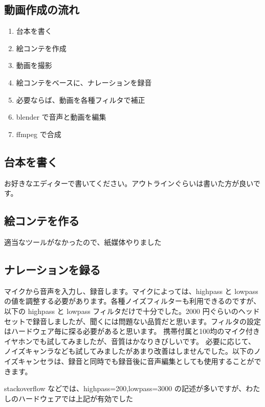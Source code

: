 \documentclass[mingoth,a4paper]{jsarticle}
\begin{document}
\subsection{動画作成の流れ}

\begin{enumerate}
\item{台本を書く}
\item{絵コンテを作成}
\item{動画を撮影}
\item{絵コンテをベースに、ナレーションを録音}
\item{必要ならば、動画を各種フィルタで補正}
\item{blender で音声と動画を編集}
\item{ffmpeg で合成}
\end{enumerate}

\subsection{台本を書く}
お好きなエディターで書いてください。アウトラインぐらいは書いた方が良いです。

\subsection{絵コンテを作る}
適当なツールがなかったので、紙媒体やりました

\subsection{ナレーションを録る}
マイクから音声を入力し、録音します。マイクによっては、highpass と lowpass の値を調整する必要があります。各種ノイズフィルターも利用できるのですが、以下の highpass と lowpass フィルタだけで十分でした。2000 円ぐらいのヘッドセットで録音しましたが、聞くには問題ない品質だと思います。フィルタの設定はハードウェア毎に探る必要があると思います。
携帯付属と100均のマイク付きイヤホンでも試してみましたが、音質はかなりきびしいです。
必要に応じて、ノイズキャンラなども試してみましたがあまり改善はしませんでした。以下のノイズキャンセラは、録音と同時でも録音後に音声編集としても使用することができます。

stackoverflow などでは、highpass=200,lowpass=3000 の記述が多いですが、わたしのハードウェアでは上記が有効でした
\end{document}
